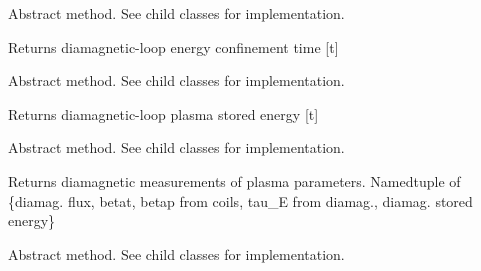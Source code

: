 \documentclass[letterpaper,10pt,english]{sphinxmanual}
\begin{document}
\begin{fulllineitems}
\begin{fulllineitems}
\end{fulllineitems}


\begin{fulllineitems}
\label{\detokenize{eqtools:eqtools.core.Equilibrium.getDiamagTauE}}
Abstract method.  See child classes for implementation.

Returns diamagnetic-loop energy confinement time {[}t{]}

\end{fulllineitems}


\begin{fulllineitems}
\label{\detokenize{eqtools:eqtools.core.Equilibrium.getDiamagWp}}
Abstract method.  See child classes for implementation.

Returns diamagnetic-loop plasma stored energy {[}t{]}

\end{fulllineitems}


\begin{fulllineitems}
\label{\detokenize{eqtools:eqtools.core.Equilibrium.getDiamag}}
Abstract method.  See child classes for implementation.

Returns diamagnetic measurements of plasma parameters.
Namedtuple of \{diamag. flux, betat, betap from coils, tau\_E from diamag., diamag. stored energy\}

\end{fulllineitems}


\begin{fulllineitems}
\label{\detokenize{eqtools:eqtools.core.Equilibrium.getWMHD}}
Abstract method.  See child classes for implementation.


\end{fulllineitems}
\end{fulllineitems}
\end{document}
